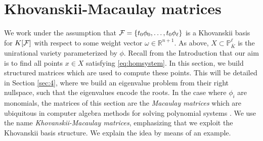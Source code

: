 \documentclass[12pt]{article}
\theoremstyle{definition}
\theoremstyle{remark}
\begin{document}
\section{Khovanskii-Macaulay matrices} \label{sec:3}

We work under the assumption that ${\cal F} = \{ t_0\phi_0, \ldots, t_0 \phi_\ell \}$ is a Khovanskii basis for $K[{\cal F}]$ with respect to some weight vector $\omega \in \mathbb{R}^{n+1}$. As above, $X \subset \mathbb{P}^\ell_{\overline{K}}$ is  the unirational variety parameterized by $\phi$. Recall from the Introduction that our aim is to find all points $x \in X$ satisfying \eqref{eq:homsystem}. In this section, we build structured matrices which are used to compute these points. This will be detailed in Section \ref{sec:4}, where we build an eigenvalue problem from their right nullspace, such that the eigenvalues encode the roots. In the case where $\phi_i$ are monomials, the matrices of this section are the \emph{Macaulay matrices} which are ubiquitous in computer algebra methods for solving polynomial systems \cite{emiris1999matrices,telen2020thesis}. We use the name \emph{Khovanskii-Macaulay matrices}, emphasizing that we exploit the Khovanskii basis structure. We explain the idea by means of an example.
\end{document}
